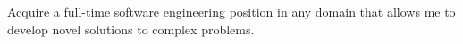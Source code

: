 

\begin{cvparagraph}

Acquire a full-time software engineering position in any domain that allows me to develop novel solutions to complex problems.

\end{cvparagraph}
